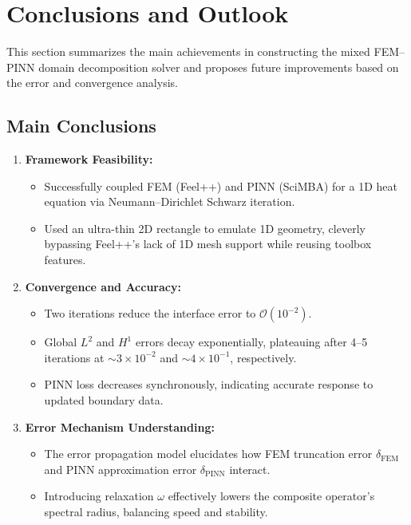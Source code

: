 \documentclass[12pt]{article}
\begin{document}
\section{Conclusions and Outlook}

This section summarizes the main achievements in constructing the mixed FEM–PINN domain decomposition solver and proposes future improvements based on the error and convergence analysis.

\subsection{Main Conclusions}

\begin{enumerate}
  \item \textbf{Framework Feasibility:}
  \begin{itemize}
    \item Successfully coupled FEM (Feel++) and PINN (SciMBA) for a 1D heat equation via Neumann–Dirichlet Schwarz iteration.
    \item Used an ultra-thin 2D rectangle to emulate 1D geometry, cleverly bypassing Feel++’s lack of 1D mesh support while reusing toolbox features.
  \end{itemize}
  \item \textbf{Convergence and Accuracy:}
  \begin{itemize}
    \item Two iterations reduce the interface error to \(\mathcal{O}(10^{-2})\).
    \item Global \(L^2\) and \(H^1\) errors decay exponentially, plateauing after 4–5 iterations at \(\sim3\times10^{-2}\) and \(\sim4\times10^{-1}\), respectively.
    \item PINN loss decreases synchronously, indicating accurate response to updated boundary data.
  \end{itemize}
  \item \textbf{Error Mechanism Understanding:}
  \begin{itemize}
    \item The error propagation model elucidates how FEM truncation error \(\delta_{\mathrm{FEM}}\) and PINN approximation error \(\delta_{\mathrm{PINN}}\) interact.
    \item Introducing relaxation \(\omega\) effectively lowers the composite operator’s spectral radius, balancing speed and stability.
  \end{itemize}
\end{enumerate}
\end{document}
